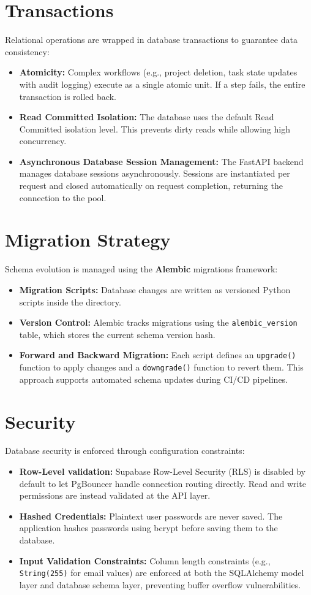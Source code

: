 \section{Transactions}
Relational operations are wrapped in database transactions to guarantee data consistency:
\begin{itemize}
    \item \textbf{Atomicity:} Complex workflows (e.g., project deletion, task state updates with audit logging) execute as a single atomic unit. If a step fails, the entire transaction is rolled back.
    \item \textbf{Read Committed Isolation:} The database uses the default Read Committed isolation level. This prevents dirty reads while allowing high concurrency.
    \item \textbf{Asynchronous Database Session Management:} The FastAPI backend manages database sessions asynchronously. Sessions are instantiated per request and closed automatically on request completion, returning the connection to the pool.
\end{itemize}

\section{Migration Strategy}
Schema evolution is managed using the \textbf{Alembic} migrations framework:
\begin{itemize}
    \item \textbf{Migration Scripts:} Database changes are written as versioned Python scripts inside the  directory.
    \item \textbf{Version Control:} Alembic tracks migrations using the \texttt{alembic\_version} table, which stores the current schema version hash.
    \item \textbf{Forward and Backward Migration:} Each script defines an \texttt{upgrade()} function to apply changes and a \texttt{downgrade()} function to revert them. This approach supports automated schema updates during CI/CD pipelines.
\end{itemize}

\section{Security}
Database security is enforced through configuration constraints:
\begin{itemize}
    \item \textbf{Row-Level validation:} Supabase Row-Level Security (RLS) is disabled by default to let PgBouncer handle connection routing directly. Read and write permissions are instead validated at the API layer.
    \item \textbf{Hashed Credentials:} Plaintext user passwords are never saved. The application hashes passwords using bcrypt before saving them to the database.
    \item \textbf{Input Validation Constraints:} Column length constraints (e.g., \texttt{String(255)} for email values) are enforced at both the SQLAlchemy model layer and database schema layer, preventing buffer overflow vulnerabilities.
\end{itemize}

